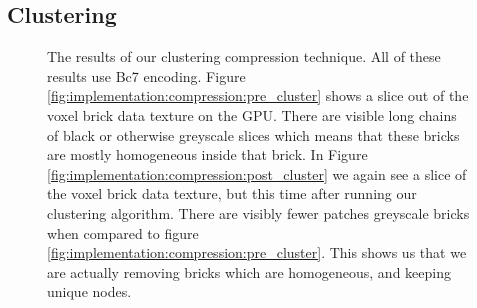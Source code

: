 \subsection{Clustering} \label{results:clustering}


\begin{figure}[H]
    \centering
    \hfill
    \caption{The results of our clustering compression technique. All of these results use Bc7 encoding. Figure \ref{fig:implementation:compression:pre_cluster} shows a slice out of the voxel brick data texture on the GPU. There are visible long chains of black or otherwise greyscale slices which means that these bricks are mostly homogeneous inside that brick. In Figure \ref{fig:implementation:compression:post_cluster} we again see a slice of the voxel brick data texture, but this time after running our clustering algorithm. There are visibly fewer patches greyscale bricks when compared to figure \ref{fig:implementation:compression:pre_cluster}. This shows us that we are actually removing bricks which are homogeneous, and keeping unique nodes.} \label{fig:implementation:compression:cluster}
\end{figure}